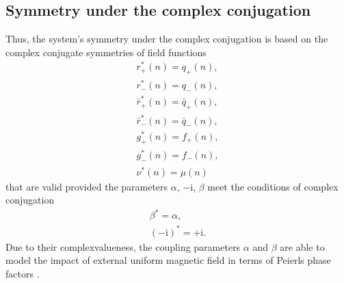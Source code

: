 \documentclass[pdftex]{sigma}
\numberwithin{equation}{section}
\begin{document}
\subsection{Symmetry under the complex conjugation}
Thus, the system's symmetry under the complex conjugation is based on the complex conjugate symmetries of field functions
\begin{gather}\label{eq-6.15}
	 r^{*}_{+}(n)=q_{+}(n),
\\ \label{eq-6.16}
	 r^{*}_{-}(n)=q_{-}(n),
\\ \label{eq-6.17}
	 \bar{r}^{*}_{+}(n)=\bar{q}_{+}(n),
\\ \label{eq-6.18}
	 \bar{r}^{*}_{-}(n)=\bar{q}_{-}(n),
\\ \label{eq-6.19}
	 g^{*}_{+}(n)=f_{+}(n),
\\ \label{eq-6.20}
	 g^{*}_{-}(n)=f_{-}(n),
\\ \label{eq-6.21}
	\nu^{*}(n)=\mu(n)
\end{gather}
that are valid provided the parameters $\alpha$, $-\mathrm{i}$, $\beta$
meet the conditions of complex conjugation{\samepage
\begin{gather}\label{eq-6.22}
	 \beta^{*}=\alpha,
\\ \label{eq-6.23}
	(-\mathrm{i})^{*}=+\mathrm{i} .
\end{gather}}%
Due to their complexvalueness, the coupling parameters $\alpha$ and $\beta$ are able to model the impact of external uniform magnetic field in terms of Peierls phase factors \cite{feynman-FLP3-1963, peierls-ZPh-80-763, vakhnenko-PRE-77-026604}.
\end{document}
